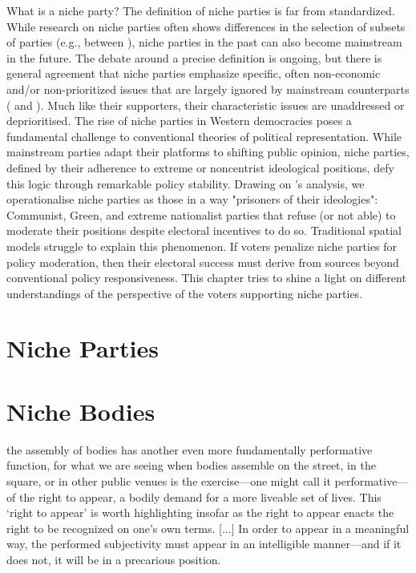 What is a niche party? The definition of niche parties is far from standardized. While research on niche parties often shows differences in the selection of subsets of parties (e.g., between \cite{adams2006, nonnemacher2023}), niche parties in the past can also become mainstream in the future. The debate around a precise definition is ongoing, but there is general agreement that niche parties emphasize specific, often non-economic and/or non-prioritized issues that are largely ignored by mainstream counterparts (\cite[see 30]{nonnemacher2023} and \cite[1]{stiers2024}). Much like their supporters, their characteristic issues are unaddressed or deprioritised. The rise of niche parties in Western democracies poses a fundamental challenge to conventional theories of political representation. While mainstream parties adapt their platforms to shifting public opinion, niche parties, defined by their adherence to extreme or noncentrist ideological positions, defy this logic through remarkable policy stability. Drawing on \textcite{adams2006}'s analysis, we operationalise niche parties as those in a way "prisoners of their ideologies": Communist, Green, and extreme nationalist parties that refuse (or not able) to moderate their positions despite electoral incentives to do so. Traditional spatial models struggle to explain this phenomenon. If voters penalize niche parties for policy moderation, then their electoral success must derive from sources beyond conventional policy responsiveness. This chapter tries to shine a light on different understandings of the perspective of the voters supporting niche parties.

\section{Niche Parties}\label{sec:Niche Parties} %

\section{Niche Bodies}\label{sec:Niche Bodies} %

the assembly of bodies has another even more fundamentally performative function, for what we are seeing when bodies assemble on the street, in the square, or in other public venues is the exercise—one might call it performative—of the right to appear, a bodily demand for a more liveable set of lives. This ‘right to appear’ is worth highlighting insofar as the right to appear enacts the right to be recognized on one’s own terms. [...] In order to appear in a meaningful way, the performed subjectivity must appear in an intelligible manner—and if it does not, it will be in a precarious position.
\cite[7]{kim2024}

